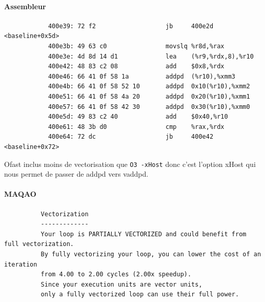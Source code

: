 \documentclass{report}
\begin{document}
        \paragraph{Assembleur}
          \begin{verbatim}
            400e39:	72 f2                	jb     400e2d <baseline+0x5d>
            400e3b:	49 63 c0             	movslq %r8d,%rax
            400e3e:	4d 8d 14 d1          	lea    (%r9,%rdx,8),%r10
            400e42:	48 83 c2 08          	add    $0x8,%rdx
            400e46:	66 41 0f 58 1a       	addpd  (%r10),%xmm3
            400e4b:	66 41 0f 58 52 10    	addpd  0x10(%r10),%xmm2
            400e51:	66 41 0f 58 4a 20    	addpd  0x20(%r10),%xmm1
            400e57:	66 41 0f 58 42 30    	addpd  0x30(%r10),%xmm0
            400e5d:	49 83 c2 40          	add    $0x40,%r10
            400e61:	48 3b d0             	cmp    %rax,%rdx
            400e64:	72 dc                	jb     400e42 <baseline+0x72>
          \end{verbatim}
          Ofast inclus moins de vectorisation que \texttt{O3 -xHost} donc c'est l'option xHost
          qui nous permet de passer de addpd vers vaddpd.
        \paragraph{MAQAO}
        \begin{verbatim}
          Vectorization
          -------------
          Your loop is PARTIALLY VECTORIZED and could benefit from full vectorization.
          By fully vectorizing your loop, you can lower the cost of an iteration
          from 4.00 to 2.00 cycles (2.00x speedup).
          Since your execution units are vector units,
          only a fully vectorized loop can use their full power.
        \end{verbatim}
\end{document}
